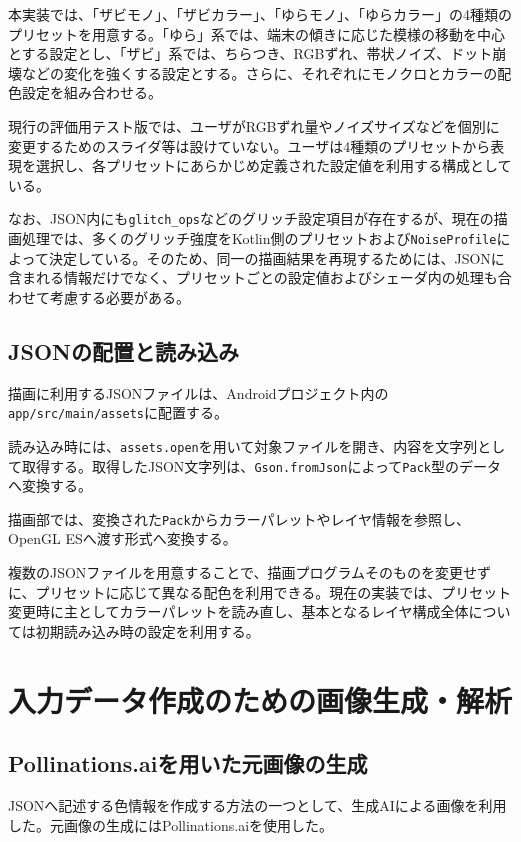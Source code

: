 本実装では、「ザビモノ」、「ザビカラー」、「ゆらモノ」、「ゆらカラー」の4種類のプリセットを用意する。「ゆら」系では、端末の傾きに応じた模様の移動を中心とする設定とし、「ザビ」系では、ちらつき、RGBずれ、帯状ノイズ、ドット崩壊などの変化を強くする設定とする。さらに、それぞれにモノクロとカラーの配色設定を組み合わせる。

現行の評価用テスト版では、ユーザがRGBずれ量やノイズサイズなどを個別に変更するためのスライダ等は設けていない。ユーザは4種類のプリセットから表現を選択し、各プリセットにあらかじめ定義された設定値を利用する構成としている。

なお、JSON内にも\texttt{glitch_ops}などのグリッチ設定項目が存在するが、現在の描画処理では、多くのグリッチ強度をKotlin側のプリセットおよび\texttt{NoiseProfile}によって決定している。そのため、同一の描画結果を再現するためには、JSONに含まれる情報だけでなく、プリセットごとの設定値およびシェーダ内の処理も合わせて考慮する必要がある。


\subsection{JSONの配置と読み込み}

描画に利用するJSONファイルは、Androidプロジェクト内の\texttt{app/src/main/assets}に配置する。

読み込み時には、\texttt{assets.open}を用いて対象ファイルを開き、内容を文字列として取得する。取得したJSON文字列は、\texttt{Gson.fromJson}によって\texttt{Pack}型のデータへ変換する。

描画部では、変換された\texttt{Pack}からカラーパレットやレイヤ情報を参照し、OpenGL ESへ渡す形式へ変換する。

複数のJSONファイルを用意することで、描画プログラムそのものを変更せずに、プリセットに応じて異なる配色を利用できる。現在の実装では、プリセット変更時に主としてカラーパレットを読み直し、基本となるレイヤ構成全体については初期読み込み時の設定を利用する。


\section{入力データ作成のための画像生成・解析}

\subsection{Pollinations.aiを用いた元画像の生成}

JSONへ記述する色情報を作成する方法の一つとして、生成AIによる画像を利用した。元画像の生成にはPollinations.aiを使用した。

